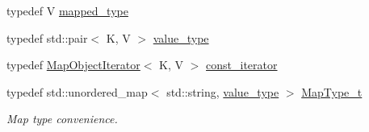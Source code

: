 \begin{DoxyCompactItemize}
typedef V \mbox{\hyperlink{classADAT_1_1MapObject_ad307fa02da187571a964db1e195a3caa}{mapped\+\_\+type}}
\item 
typedef std\+::pair$<$ K, V $>$ \mbox{\hyperlink{classADAT_1_1MapObject_ad985e6ff5b35a72c79d4b466d316cc0a}{value\+\_\+type}}
\item 
typedef \mbox{\hyperlink{classADAT_1_1MapObjectIterator}{Map\+Object\+Iterator}}$<$ K, V $>$ \mbox{\hyperlink{classADAT_1_1MapObject_a4622cd7d3b6fed18fe226d28091cc6c8}{const\+\_\+iterator}}
\item 
typedef std\+::unordered\+\_\+map$<$ std\+::string, \mbox{\hyperlink{classADAT_1_1MapObject_ad985e6ff5b35a72c79d4b466d316cc0a}{value\+\_\+type}} $>$ \mbox{\hyperlink{classADAT_1_1MapObject_ad6a4952087d3de5a43d08b2ea2ad270b}{Map\+Type\+\_\+t}}
\begin{DoxyCompactList}\small\item\em Map type convenience. \end{DoxyCompactList}\end{DoxyCompactItemize}
